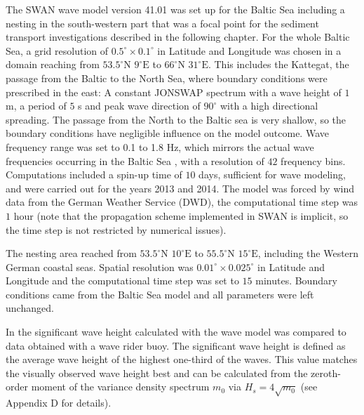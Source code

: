 The SWAN wave model version 41.01 was set up for the Baltic Sea including a 
nesting in the south-western part that was a focal point for the sediment 
transport investigations described in the following chapter. For the whole 
Baltic Sea, a grid 
resolution of $0.5^\circ \times 0.1^\circ $ in Latitude and Longitude was 
chosen 
in a domain reaching from $53.5^\circ \text{N } 9^\circ \text{E}$ to $66^\circ 
\text{N } 31^\circ \text{E}$. This includes the Kattegat, the passage from the 
Baltic to the North Sea, where boundary conditions were prescribed in the east: 
A constant JONSWAP spectrum with a wave height of $1$ m, a period of $5$ s and 
peak wave direction of $90^\circ$ with a high directional spreading. The 
passage 
from the North to the Baltic sea is very shallow, so the boundary conditions 
have negligible influence on the model outcome. Wave frequency range was set to 
0.1 to 1.8 Hz, which mirrors the actual wave frequencies occurring in the 
Baltic Sea \citep[][]{balticsea}, with a resolution of $42$ frequency bins. 
Computations included a spin-up time of $10$ days, sufficient for wave 
modeling, 
and were carried out for the years 2013 and 2014. The model was forced by wind 
data from the German Weather Service (DWD), the computational time step was $1$ 
hour (note that the propagation scheme implemented in SWAN is implicit, so the 
time step is not restricted by numerical issues). 

The nesting area reached from $53.5^\circ \text{N } 10^\circ \text{E}$ to 
$55.5^\circ \text{N } 15^\circ \text{E}$, including the Western German coastal 
seas. Spatial resolution was $0.01^\circ \times 0.025^\circ $ in Latitude and 
Longitude and the computational time step was set to $15$ minutes. Boundary 
conditions came from the Baltic Sea model and all parameters were left 
unchanged.

In  the significant wave height calculated with the wave model was 
compared to data obtained with a wave rider buoy. The significant wave height 
is defined as the average wave height of the highest one-third of the waves. 
This value matches the visually observed wave height best and can be calculated 
from the zeroth-order moment of the variance density spectrum $m_0$ via 
$H_s = 4 \sqrt{m_0}$ (see Appendix D for details).

